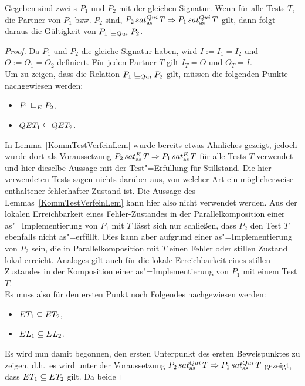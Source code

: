 \begin{Lem}
  \label{StilleTestVerfeinLem}
  Gegeben sind zwei \MEIO{}s $P_1$ und $P_2$ mit der gleichen Signatur. Wenn
  für alle Tests $T$, die Partner von $P_1$ bzw. $P_2$ sind, $P_2\hspace{0.05cm}sat_\mathrm{as}^{Qui}\hspace{0.05cm} T
  \Rightarrow P_1\hspace{0.05cm}sat_\mathrm{as}^{Qui}\hspace{0.05cm} T$ gilt, dann folgt daraus die Gültigkeit von
  $P_1 \sqsubseteq  _{Qui} P_2$.
\end{Lem}
\begin{proof}
  Da $P_1$ und $P_2$ die gleiche Signatur haben, wird $I:=I_1=I_2$ und
  $O:=O_1=O_2$ definiert. Für jeden Partner $T$ gilt $I_T=O$ und $O_T=I$.\\
  Um zu zeigen, dass die Relation $P_1 \sqsubseteq  _{Qui} P_2$ gilt, müssen die folgenden
  Punkte nachgewiesen werden:
  \begin{itemize}
    \item $P_1 \sqsubseteq  _E P_2$,
    \item $QET _1\subseteq QET _2$.
  \end{itemize}
  In Lemma~\ref{KommTestVerfeinLem} wurde bereits etwas Ähnliches gezeigt,
  jedoch wurde dort als Voraussetzung $P_2\hspace{0.05cm}sat_\mathrm{as}^E\hspace{0.05cm} T\Rightarrow P_1\hspace{0.05cm}sat_\mathrm{as}^E\hspace{0.05cm} T$
  für alle Tests $T$ verwendet und hier dieselbe Aussage mit der
  Test"=Erfüllung für Stillstand. Die hier verwendeten Tests sagen nichts
  darüber aus, von welcher Art ein möglicherweise enthaltener fehlerhafter
  Zustand ist. Die Aussage des Lemmas~\ref{KommTestVerfeinLem} kann hier also
  nicht verwendet werden. Aus der lokalen Erreichbarkeit eines Fehler-Zustandes
  in der Parallelkomposition einer as"=Implementierung von $P_1$ mit $T$ lässt
  sich nur schließen, dass $P_2$ den Test $T$ ebenfalls nicht as"=erfüllt. Dies
  kann aber aufgrund einer as"=Implementierung von $P_2$ sein, die in
  Parallelkomposition mit $T$ einen Fehler oder stillen Zustand lokal erreicht.
  Analoges gilt auch für die lokale Erreichbarkeit eines stillen Zustandes in
  der Komposition einer as"=Implementierung von $P_1$ mit einem Test $T$.\\
  Es muss also für den ersten Punkt noch Folgendes nachgewiesen werden:
  \begin{itemize}
    \item $ET _1\subseteq ET _2$,
    \item $EL _1\subseteq EL _2$.
  \end{itemize}
  Es wird nun damit begonnen, den ersten Unterpunkt des ersten Beweispunktes zu
  zeigen, d.h.\ es wird unter der Voraussetzung $P_2\hspace{0.05cm}sat_\mathrm{as}^{Qui}\hspace{0.05cm} T\Rightarrow
  P_1\hspace{0.05cm}sat_\mathrm{as}^{Qui}\hspace{0.05cm} T$ gezeigt, dass $ET _1\subseteq ET _2$ gilt. Da beide

\end{proof}
